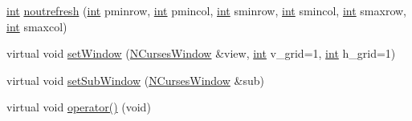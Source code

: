 \begin{DoxyCompactItemize}
\item 
\hyperlink{term__entry_8h_ad65b480f8c8270356b45a9890f6499ae}{int} \hyperlink{class_n_curses_pad_a57e8e632c1087434e43bbb82258f9887}{noutrefresh} (\hyperlink{term__entry_8h_ad65b480f8c8270356b45a9890f6499ae}{int} pminrow, \hyperlink{term__entry_8h_ad65b480f8c8270356b45a9890f6499ae}{int} pmincol, \hyperlink{term__entry_8h_ad65b480f8c8270356b45a9890f6499ae}{int} sminrow, \hyperlink{term__entry_8h_ad65b480f8c8270356b45a9890f6499ae}{int} smincol, \hyperlink{term__entry_8h_ad65b480f8c8270356b45a9890f6499ae}{int} smaxrow, \hyperlink{term__entry_8h_ad65b480f8c8270356b45a9890f6499ae}{int} smaxcol)
\item 
virtual void \hyperlink{class_n_curses_pad_a05af68c8f685758d9c033290c42817e5}{set\-Window} (\hyperlink{class_n_curses_window}{N\-Curses\-Window} \&view, \hyperlink{term__entry_8h_ad65b480f8c8270356b45a9890f6499ae}{int} v\-\_\-grid=1, \hyperlink{term__entry_8h_ad65b480f8c8270356b45a9890f6499ae}{int} h\-\_\-grid=1)
\item 
virtual void \hyperlink{class_n_curses_pad_ae24f9df00586a59fe4d48d7f8b8b9001}{set\-Sub\-Window} (\hyperlink{class_n_curses_window}{N\-Curses\-Window} \&sub)
\item 
virtual void \hyperlink{class_n_curses_pad_ac81aa45cfd71d7337bba68996a2a2541}{operator()} (void)
\end{DoxyCompactItemize}
